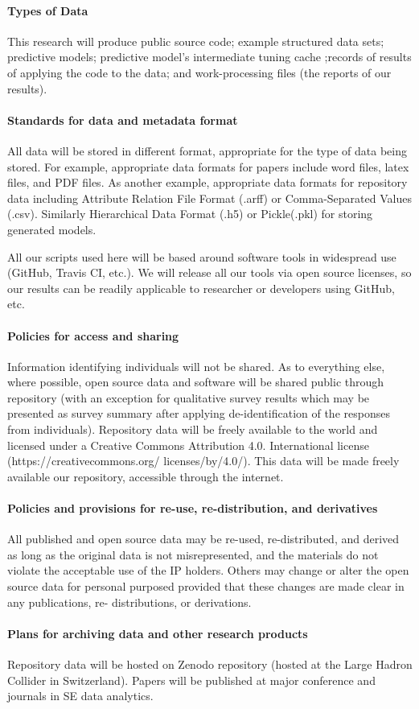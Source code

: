 \paragraph{Types of Data}
This research will produce public source code; example  structured data sets; predictive models; predictive model's intermediate tuning cache ;records of results of applying the code to the data;  and work-processing files (the reports of our results).
\vspace{8pt}

\paragraph{Standards for data and metadata format}
All data will be stored in different format, appropriate for the type of data being stored. For example, appropriate data formats for papers include word files, latex files, and PDF files. As another example, appropriate data formats for repository data including Attribute Relation File Format (.arff) or Comma-Separated Values (.csv). Similarly Hierarchical Data Format (.h5) or Pickle(.pkl) for storing generated models. 
\vspace{8pt}

\noindent
All our scripts used here will be based around software tools in widespread use (GitHub, Travis CI, etc.). We will release all our tools via open source licenses, so our results can be readily applicable to researcher or developers using GitHub, etc. 
\vspace{8pt}

\paragraph{Policies for access and sharing}
Information identifying 
individuals will not be shared.
As to everything else,
where possible, open source data and software will be shared public through repository (with an exception for qualitative survey results which may be presented as survey summary after applying de-identification of the responses from individuals). Repository data will be freely available to the world and licensed under a Creative Commons Attribution 4.0. International license (https://creativecommons.org/ licenses/by/4.0/). This data will be made freely available our repository, accessible through the internet. 
\vspace{8pt}
 

\paragraph{Policies and provisions for re-use, re-distribution, and derivatives}
All published and open source data may be re-used, re-distributed, and derived as long as the original data is not misrepresented, and the materials do not violate the acceptable use of the IP holders. Others may change or alter the open source data for personal purposed provided that these changes are made clear in any publications, re- distributions, or derivations. 
\vspace{8pt}

\paragraph{Plans for archiving data and other research products}
Repository data will be hosted on Zenodo repository (hosted at the Large Hadron Collider in Switzerland). Papers will be published at major conference and journals in SE data analytics.